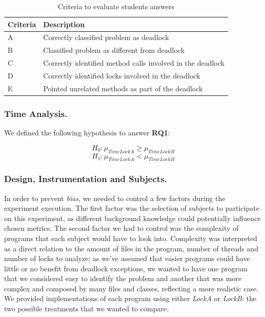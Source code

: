 \begin{table}
\begin{center}
\caption{Criteria to evaluate students answers}\label{tab:crit}
\begin{tabular}{|l|l|}
\hline
Criteria & Description \\
\hline
A & Correctly classified problem as deadlock \\
B & Classified problem as different from deadlock  \\
C & Correctly identified method calls involved in the deadlock \\
D & Correctly identified locks involved in the deadlock  \\
E & Pointed unrelated methods as part of the deadlock \\
\hline
\end{tabular}
\end{center}
\end{table}

\subsubsection{Time Analysis.}

We defined the following hypothesis to answer {\bf RQ1}:

\begin{equation}
  H_{0} : \mu_{TimeLockA} \geq \mu_{TimeLockB}
\end{equation}
\begin{equation}
  H_{1} : \mu_{TimeLockA} < \mu_{TimeLockB}
\end{equation}

\subsubsection{Design, Instrumentation and Subjects.}

In order to prevent \emph{bias}, we needed to control a few factors during the experiment execution. The first factor was the selection of subjects to participate on this experiment, as different background knowledge could potentially influence chosen metrics. The second factor we had to control was the complexity of programs that each subject would have to look into. Complexity was interpreted as a direct relation to the amount of files in the program, number of threads and number of locks to analyze; as we've assumed that easier programs could have little or no benefit from deadlock exceptions, we wanted to have one program that we considered easy to identify the problem and another that was more complex and composed by many files and classes, reflecting a more realistic case. We provided implementations of each program using either \emph{LockA} or \emph{LockB}: the two possible treatments that we wanted to compare.

